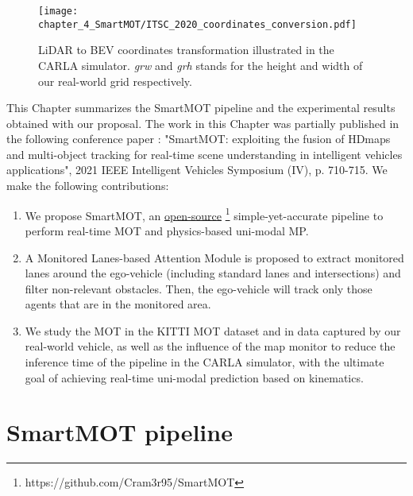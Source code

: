 \begin{figure}[h]
	\centering
	\captionsetup{justification=justified}
	\texttt{[image: chapter\_4\_SmartMOT/ITSC\_2020\_coordinates\_conversion.pdf]}
	\caption[\ac{LiDAR} to \ac{BEV} coordinates transformation illustrated in the CARLA simulator]{\ac{LiDAR} to \ac{BEV} coordinates transformation illustrated in the CARLA simulator. \textit{grw} and \textit{grh} stands for the height and width of our real-world grid respectively.}
	\label{fig:chapter_4_SmartMOT/ITSC_2020_coordinates_conversion}
\end{figure}

This Chapter summarizes the SmartMOT pipeline and the experimental results obtained with our proposal. The work in this Chapter was partially published in the following conference paper \cite{gomez2021smartmot}: "SmartMOT: exploiting the fusion of \acp{HDmap} and multi-object tracking for real-time scene understanding in intelligent vehicles applications", 2021 IEEE Intelligent Vehicles Symposium (IV), p. 710-715. We make the following contributions:

\begin{enumerate}
	
	\item We propose SmartMOT, an \href{https://github.com/Cram3r95/SmartMOT}{open-source} \footnote{https://github.com/Cram3r95/SmartMOT} simple-yet-accurate pipeline to perform real-time \ac{MOT} and physics-based uni-modal \ac{MP}.
	
	\item A Monitored Lanes-based Attention Module is proposed to extract monitored lanes around the ego-vehicle (including standard lanes and intersections) and filter non-relevant obstacles. Then, the ego-vehicle will track only those agents that are in the monitored area.
	
	\item We study the \ac{MOT} in the KITTI \ac{MOT} dataset and in data captured by our real-world vehicle, as well as the influence of the map monitor to reduce the inference time of the pipeline in the \ac{CARLA} simulator, with the ultimate goal of achieving real-time uni-modal prediction based on kinematics.
	
\end{enumerate}

\section{SmartMOT pipeline}
\label{sec:4_smartmot}

